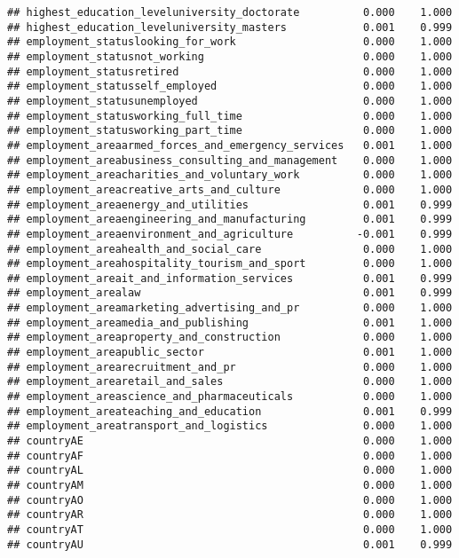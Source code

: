 \documentclass[
]{article}
\begin{document}
\begin{verbatim}
## highest_education_leveluniversity_doctorate          0.000    1.000
## highest_education_leveluniversity_masters            0.001    0.999
## employment_statuslooking_for_work                    0.000    1.000
## employment_statusnot_working                         0.000    1.000
## employment_statusretired                             0.000    1.000
## employment_statusself_employed                       0.000    1.000
## employment_statusunemployed                          0.000    1.000
## employment_statusworking_full_time                   0.000    1.000
## employment_statusworking_part_time                   0.000    1.000
## employment_areaarmed_forces_and_emergency_services   0.001    1.000
## employment_areabusiness_consulting_and_management    0.000    1.000
## employment_areacharities_and_voluntary_work          0.000    1.000
## employment_areacreative_arts_and_culture             0.000    1.000
## employment_areaenergy_and_utilities                  0.001    0.999
## employment_areaengineering_and_manufacturing         0.001    0.999
## employment_areaenvironment_and_agriculture          -0.001    0.999
## employment_areahealth_and_social_care                0.000    1.000
## employment_areahospitality_tourism_and_sport         0.000    1.000
## employment_areait_and_information_services           0.001    0.999
## employment_arealaw                                   0.001    0.999
## employment_areamarketing_advertising_and_pr          0.000    1.000
## employment_areamedia_and_publishing                  0.001    1.000
## employment_areaproperty_and_construction             0.000    1.000
## employment_areapublic_sector                         0.001    1.000
## employment_arearecruitment_and_pr                    0.000    1.000
## employment_arearetail_and_sales                      0.000    1.000
## employment_areascience_and_pharmaceuticals           0.000    1.000
## employment_areateaching_and_education                0.001    0.999
## employment_areatransport_and_logistics               0.000    1.000
## countryAE                                            0.000    1.000
## countryAF                                            0.000    1.000
## countryAL                                            0.000    1.000
## countryAM                                            0.000    1.000
## countryAO                                            0.000    1.000
## countryAR                                            0.000    1.000
## countryAT                                            0.000    1.000
## countryAU                                            0.001    0.999

\end{verbatim}
\end{document}
